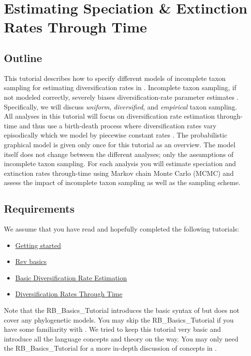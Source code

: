 \section{Estimating Speciation \& Extinction Rates Through Time}

\subsection{Outline}

This tutorial describes how to specify different models of incomplete taxon sampling \citep{Hoehna2011,Hoehna2014a} for estimating diversification rates in \RevBayes \citep{Hoehna2016b}.
Incomplete taxon sampling, if not modeled correctly, severely biases diversification-rate parameter estimates \citep{Cusimano2010,Hoehna2011}. 
Specifically, we will discuss \emph{uniform}, \emph{diversified}, and \emph{empirical} taxon sampling.
All analyses in this tutorial will focus on diversification rate estimation through-time and thus use a birth-death process where diversification rates vary episodically which we model by piecewise constant rates \RevBayes \citep{Hoehna2015a,May2016}.
The probabilistic graphical model is given only once for this tutorial as an overview.
The model itself does not change between the different analyses; only the assumptions of incomplete taxon sampling.
For each analysis you will estimate speciation and extinction rates through-time using Markov chain Monte Carlo (MCMC) and assess the impact of incomplete taxon sampling as well as the sampling scheme.


\subsection{Requirements}
We assume that you have read and hopefully completed the following tutorials:
\begin{itemize}
\item \href{https://github.com/revbayes/revbayes_tutorial/raw/master/tutorial_TeX/RB_Getting_Started/RB_Getting_Started.pdf}{Getting started}
\item \href{https://github.com/revbayes/revbayes_tutorial/raw/master/tutorial_TeX/RB_Basics_Tutorial/RB_Basics_Tutorial.pdf}{Rev basics}
\item \href{https://github.com/revbayes/revbayes_tutorial/raw/master/tutorial_TeX/RB_DiversificationRate_Tutorial/RB_DiversificationRate_Tutorial.pdf}{Basic Diversification Rate Estimation}
\item \href{https://github.com/revbayes/revbayes_tutorial/raw/master/tutorial_TeX/RB_DiversificationRate_Episodic_Tutorial/RB_DiversificationRate_Episodic_Tutorial.pdf}{Diversification Rates Through Time}
\end{itemize}
Note that the RB\_Basics\_Tutorial introduces the basic syntax of \Rev but does not cover any phylogenetic models.
You may skip the RB\_Basics\_Tutorial if you have some familiarity with \R.
We tried to keep this tutorial very basic and introduce all the language concepts and theory on the way.
You may only need the RB\_Basics\_Tutorial for a more in-depth discussion of concepts in \Rev.


